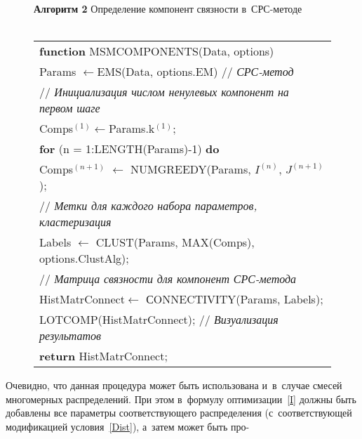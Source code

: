 \begin{multicols}{2}
\begin{figure*}
{\small \begin{center}
\textbf{Алгоритм 2} Определение компонент связности в~СРС-методе\\
{\ }\\[-6pt]
\begin{tabular}{l}
\hline
\textbf{function} {\normalsize MSMC}OMPONENTS({Data, options})\\
\hspace*{5mm}Params $\gets${\normalsize EM}S(Data, options.EM) // \textit{СРС-метод}\\
\hspace*{5mm}// \textit{Инициализация числом ненулевых компонент на первом шаге}\\
\hspace*{5mm}Comps$^{(1)}$$\gets$Params.k$^{(1)}$;\\
\hspace*{5mm}\textbf{for} (n = 1:LENGTH(Params)-1) \textbf{do}\\
\hspace*{10mm}Comps$^{(n+1)}$ $\gets$ {\normalsize N}UM{\normalsize G}REEDY({Params, $ I^{(n)}$, $J^{(n+1)}$});\\
\hspace*{5mm}// \textit{Метки для каждого набора параметров, кластеризация}\\
\hspace*{5mm}Labels $\gets$ {\normalsize C}LUST(Params, {MAX}(Comps), options.ClustAlg);\\
\hspace*{5mm}// \textit{Матрица связности для компонент СРС-метода}\\
\hspace*{5mm}HistMatrConnect$\gets$ {\normalsize С}ONNECTIVITY({Params, Labels});  \\
\hspace*{5mm}{\normalsize P}LOT{\normalsize C}OMP(HistMatrConnect); // \textit{Визуализация результатов}\\
\hspace*{5mm}\textbf{return} HistMatrConnect;\\
\hline
\end{tabular}
\end{center}}
\vspace*{-6pt}
\end{figure*}

Очевидно, что данная процедура может быть использована и~в~случае 
смесей многомерных распределений. При этом в~формулу оптимизации~\eqref{I}
 долж\-ны быть добавлены все па\-ра\-мет\-ры со\-от\-вет\-ст\-ву\-юще\-го распределения 
 (с~соответствующей модификацией условия~\eqref{Dist}), 
 а~затем может быть про-\linebreak
 \vspace*{-12pt}
 

\end{multicols}
